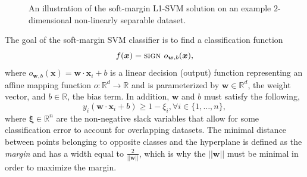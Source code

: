 \documentclass[reqno]{vcuthesis}
\newcommand{\norm}[1]{{||#1||}}
\newcommand{\reals}{{\mathbb{R}}}
\numberwithin{equation}{chapter}
\begin{document}
\begin{figure}[t!]
\begin{minipage}[b]{0.45\textwidth}
\caption{An illustration of the soft-margin L1-SVM solution on an example $2$-dimensional non-linearly separable dataset.}
\label{fig:nonlinsepdata}
\end{minipage}
\end{figure}

The goal of the soft-margin SVM classifier is to find a classification function
\begin{equation}
\centering
f(\bm x) = \textsc{sign } o_{\bm w,b}(\bm x),
\label{eq:classificationfunction}
\end{equation}
where $o_{\bm w,b}(\bm x) = \bm{w}\cdot\bm{x}_i+b$ is a linear decision (output) function representing an affine mapping function $o: \reals^d \rightarrow \reals$ and is parameterized by $\bm w \in \reals^d$, the weight vector, and $b \in \reals$, the bias term. In addition, $\bm w$ and $b$ must satisfy the following,
\begin{equation}
y_i\left( \bm{w} \cdot \bm{x}_i + b\right) \geq 1 - \xi_i, \forall i \in \{1,\ldots,n\},
\label{eqn:softsvmconstraint}
\end{equation}
where $\bm \xi \in \reals^n$ are the non-negative slack variables that allow for some classification error to account for overlapping datasets. The minimal distance between points belonging to opposite classes and the hyperplane is defined as the \textit{margin} and has a width equal to $\frac{2}{||\bm{w}||}$, which is why the $\norm{\bm w}$ must be minimal in order to maximize the margin. 
\end{document}
